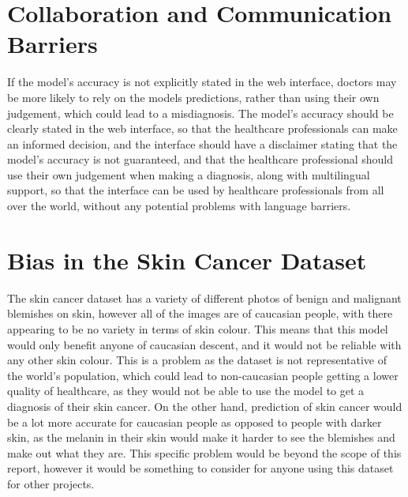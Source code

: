 \documentclass[]{final_report}
\begin{document}
\section{Collaboration and Communication Barriers}
If the model's accuracy is not explicitly stated in the web interface, doctors may be more likely to rely on the models predictions, rather than using their own judgement, which could lead to a misdiagnosis. The model's accuracy should be clearly stated in the web interface, so that the healthcare professionals can make an informed decision, and the interface should have a disclaimer stating that the model's accuracy is not guaranteed, and that the healthcare professional should use their own judgement when making a diagnosis, along with multilingual support, so that the interface can be used by healthcare professionals from all over the world, without any potential problems with language barriers.

\section{Bias in the Skin Cancer Dataset}
The skin cancer dataset has a variety of different photos of benign and malignant blemishes on skin, however all of the images are of caucasian people, with there appearing to be no variety in terms of skin colour. This means that this model would only benefit anyone of caucasian descent, and it would not be reliable with any other skin colour. This is a problem as the dataset is not representative of the world's population, which could lead to non-caucasian people getting a lower quality of healthcare, as they would not be able to use the model to get a diagnosis of their skin cancer.
On the other hand, prediction of skin cancer would be a lot more accurate for caucasian people as opposed to people with darker skin, as the melanin in their skin would make it harder to see the blemishes and make out what they are. This specific problem would be beyond the scope of this report, however it would be something to consider for anyone using this dataset for other projects.
\end{document}
